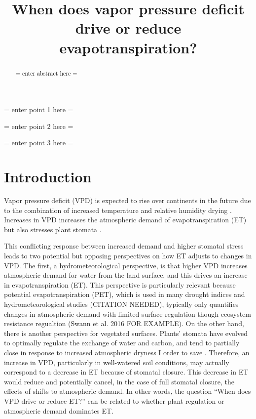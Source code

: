 \documentclass[draft,linenumbers]{agujournal}
\begin{document}
\title{When does vapor pressure deficit drive or reduce evapotranspiration?}





\begin{keypoints}
\item = enter point 1 here = 
\item = enter point 2 here = 
\item = enter point 3 here = 
\end{keypoints}


\begin{abstract}
= enter abstract here =
\end{abstract}

\section{Introduction}

Vapor pressure deficit (VPD) is expected to rise over continents in the future due to the combination of increased temperature and relative humidity drying \citep{Byrne_2013}. Increases in VPD increases the atmospheric demand of evapotranspiration (ET) \citep{Monteith_1965} but also stresses plant stomata \citep{Leuning_1990, MEDLYN_2011}.

This conflicting response between increased demand and higher stomatal stress leads to two potential but opposing perspectives on how ET adjusts to changes in VPD. The first, a hydrometeorological perspective, is that higher VPD increases atmospheric demand for water from the land surface, and this drives an increase in evapotranspiration (ET). This perspective is particularly relevant because potential evapotranspiration (PET), which is used in many drought indices and hydrometeorological studies (CITATION NEEDED), typically only quantifies changes in atmospheric demand with limited surface regulation though ecosystem resistance regualtion (Swann et al. 2016 FOR EXAMPLE). On the other hand, there is another perspective for vegetated surfaces. Plants' stomata have evolved to optimally regulate the exchange of water and carbon, and tend to partially close in response to increased atmospheric dryness I order to save \citep{Ball_1987, Leuning_1990, MEDLYN_2011}. Therefore, an increase in VPD, particularly in well-watered soil conditions, may actually correspond to a decrease in ET because of stomatal closure. This decrease in ET would reduce and potentially cancel, in the case of full stomatal closure, the effects of shifts to atmospheric demand. In other words, the  question ``When does VPD drive or reduce ET?'' can be related to whether plant regulation or atmospheric demand dominates ET.
\end{document}
